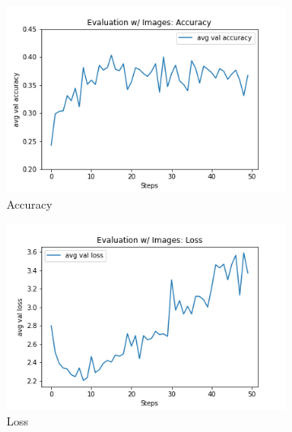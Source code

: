 \begin{figure}[h]
     \centering
     \begin{subfigure}[b]{0.3\textwidth}
         \centering
         \includegraphics[width=\textwidth]{./figure/results/baseline_and_blindfolding/images/avg val accuracy.png}
         \caption{Accuracy} %
         \label{fig:baseline_accuracy}
     \end{subfigure}
     \hfill
          \begin{subfigure}[b]{0.3\textwidth}
         \centering
         \includegraphics[width=\textwidth]{./figure/results/baseline_and_blindfolding/images/avg val loss.png}
         \caption{Loss}
         \label{fig:baseline_loss}
     \end{subfigure}
     \hfill
     \begin{subfigure}[b]{0.3\textwidth}
         \centering

\end{subfigure}
\end{figure}
